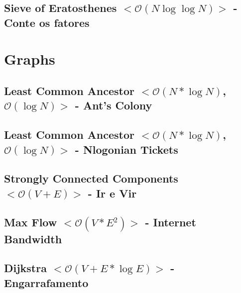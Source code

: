 \documentclass[11pt, a4paper, twoside, notitlepage]{article}
\begin{document}


\subsection{Sieve of Eratosthenes $<\mathcal{O}(N\log \log N)>$ - Conte os fatores}



\newpage

\section{Graphs}

\subsection{Least Common Ancestor $<\mathcal{O}(N*\log N)$, $\mathcal{O}(\log N)>$ - Ant's Colony}



\subsection{Least Common Ancestor $<\mathcal{O}(N*\log N)$, $\mathcal{O}(\log N)>$ - Nlogonian Tickets}



\subsection{Strongly Connected Components $<\mathcal{O}(V+E)>$ - Ir e Vir}



\subsection{Max Flow $<\mathcal{O}(V*E^{2})>$ - Internet Bandwidth}



\subsection{Dijkstra $<\mathcal{O}(V+E*\log E)>$ - Engarrafamento}


\end{document}

